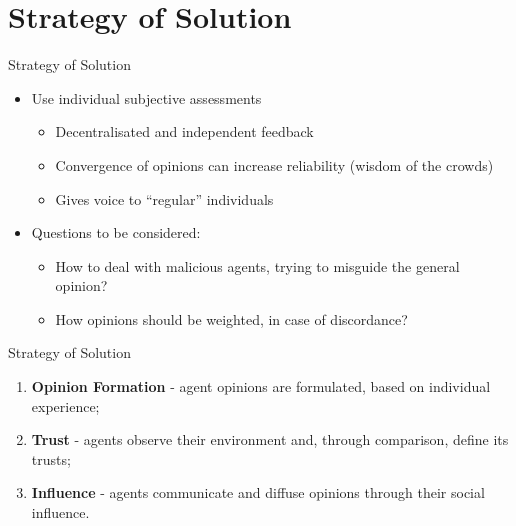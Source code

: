 \section{Strategy of Solution}\label{strategy-of-solution}

\begin{frame}{Strategy of Solution}

\begin{itemize}
\tightlist
\item
  Use individual subjective assessments

  \begin{itemize}
  \tightlist
  \item
    Decentralisated and independent feedback
  \item
    Convergence of opinions can increase reliability (wisdom of the
    crowds)
  \item
    Gives voice to ``regular'' individuals
  \end{itemize}
\item
  Questions to be considered:

  \begin{itemize}
  \tightlist
  \item
    How to deal with malicious agents, trying to misguide the general
    opinion?
  \item
    How opinions should be weighted, in case of discordance?
  \end{itemize}
\end{itemize}

\end{frame}

\begin{frame}{Strategy of Solution}

\begin{enumerate}
\def\labelenumi{\arabic{enumi}.}
\tightlist
\item
  \textbf{Opinion Formation} - agent opinions are formulated, based on
  individual experience;
\item
  \textbf{Trust} - agents observe their environment and, through
  comparison, define its trusts;
\item
  \textbf{Influence} - agents communicate and diffuse opinions through
  their social influence.
\end{enumerate}

\end{frame}

